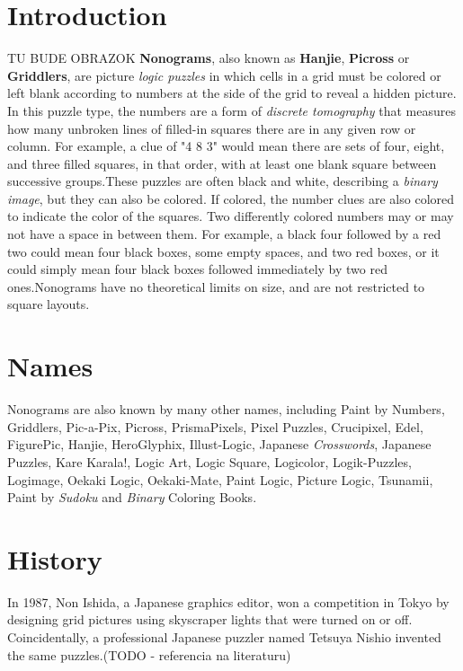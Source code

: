 \chapter*{Introduction}

TU BUDE OBRAZOK
\textbf{Nonograms}, also known as \textbf{Hanjie}, \textbf{Picross} or \textbf{Griddlers}, are picture \textit{logic puzzles} in which cells in a grid must be colored or left blank according to numbers at the side of the grid to reveal a hidden picture. In this puzzle type, the numbers are a form of \textit{discrete tomography} that measures how many unbroken lines of filled-in squares there are in any given row or column. For example, a clue of "4 8 3" would mean there are sets of four, eight, and three filled squares, in that order, with at least one blank square between successive groups.These puzzles are often black and white, describing a \textit{binary image}, but they can also be colored. If colored, the number clues are also colored to indicate the color of the squares. Two differently colored numbers may or may not have a space in between them. For example, a black four followed by a red two could mean four black boxes, some empty spaces, and two red boxes, or it could simply mean four black boxes followed immediately by two red ones.Nonograms have no theoretical limits on size, and are not restricted to square layouts.
\chapter{Names}
Nonograms are also known by many other names, including Paint by Numbers, Griddlers, Pic-a-Pix, Picross, PrismaPixels, Pixel Puzzles, Crucipixel, Edel, FigurePic, Hanjie, HeroGlyphix, Illust-Logic, Japanese \textit{Crosswords}, Japanese Puzzles, Kare Karala!, Logic Art, Logic Square, Logicolor, Logik-Puzzles, Logimage, Oekaki Logic, Oekaki-Mate, Paint Logic, Picture Logic, Tsunamii, Paint by \textit{Sudoku} and \textit{Binary} Coloring Books.
\chapter{History}
In 1987, Non Ishida, a Japanese graphics editor, won a competition in Tokyo by designing grid pictures using skyscraper lights that were turned on or off. Coincidentally, a professional Japanese puzzler named Tetsuya Nishio invented the same puzzles.(TODO - referencia na literaturu)
